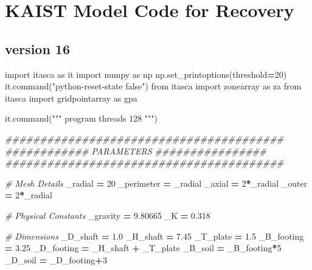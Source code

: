 \documentclass[a4paper, nobind]{templates/ociamthesis}
\newenvironment{Shaded}{\begin{snugshade}}{\end{snugshade}}
\newcommand{\CommentTok}[1]{\textcolor[rgb]{0.56,0.35,0.01}{\textit{#1}}}
\newcommand{\DecValTok}[1]{\textcolor[rgb]{0.00,0.00,0.81}{#1}}
\newcommand{\FloatTok}[1]{\textcolor[rgb]{0.00,0.00,0.81}{#1}}
\newcommand{\ImportTok}[1]{#1}
\newcommand{\NormalTok}[1]{#1}
\newcommand{\OperatorTok}[1]{\textcolor[rgb]{0.81,0.36,0.00}{\textbf{#1}}}
\newcommand{\StringTok}[1]{\textcolor[rgb]{0.31,0.60,0.02}{#1}}
\renewenvironment{Shaded}
{
  \vspace{10pt}%
  \begin{snugshade}%
}{%
  \end{snugshade}%
  \vspace{8pt}%
}
\begin{document}
\newpage

\hypertarget{kaist-model-code-for-recovery}{%
\chapter{KAIST Model Code for Recovery}\label{kaist-model-code-for-recovery}}

\hypertarget{version-16}{%
\section{version 16}\label{version-16}}

\begin{Shaded}
\begin{Highlighting}[]
\ImportTok{import}\NormalTok{ itasca }\ImportTok{as}\NormalTok{ it}
\ImportTok{import}\NormalTok{ numpy }\ImportTok{as}\NormalTok{ np}
\NormalTok{np.set\_printoptions(threshold}\OperatorTok{=}\DecValTok{20}\NormalTok{)}
\NormalTok{it.command(}\StringTok{"python{-}reset{-}state false"}\NormalTok{)}
\ImportTok{from}\NormalTok{ itasca }\ImportTok{import}\NormalTok{ zonearray }\ImportTok{as}\NormalTok{ za}
\ImportTok{from}\NormalTok{ itasca }\ImportTok{import}\NormalTok{ gridpointarray }\ImportTok{as}\NormalTok{ gpa}

\NormalTok{it.command(}\StringTok{"""}
\StringTok{program threads 128}
\StringTok{"""}\NormalTok{)}

\CommentTok{\#\#\#\#\#\#\#\#\#\#\#\#\#\#\#\#\#\#\#\#\#\#\#\#\#\#\#\#\#\#\#\#\#\#\#\#\#\#\#\#}
\CommentTok{\#\#\#\#\#\#\#\#\#\#\#\# PARAMETERS \#\#\#\#\#\#\#\#\#\#\#\#\#\#\#\#}
\CommentTok{\#\#\#\#\#\#\#\#\#\#\#\#\#\#\#\#\#\#\#\#\#\#\#\#\#\#\#\#\#\#\#\#\#\#\#\#\#\#\#\#}

\CommentTok{\# Mesh Details}
\NormalTok{\_radial }\OperatorTok{=} \DecValTok{20}
\NormalTok{\_perimeter }\OperatorTok{=}\NormalTok{ \_radial}
\NormalTok{\_axial }\OperatorTok{=} \DecValTok{2}\OperatorTok{*}\NormalTok{\_radial}
\NormalTok{\_outer }\OperatorTok{=} \DecValTok{2}\OperatorTok{*}\NormalTok{\_radial}

\CommentTok{\# Physical Constants}
\NormalTok{\_gravity }\OperatorTok{=} \FloatTok{9.80665}
\NormalTok{\_K }\OperatorTok{=} \FloatTok{0.318}

\CommentTok{\# Dimensions}
\NormalTok{\_D\_shaft }\OperatorTok{=} \FloatTok{1.0}
\NormalTok{\_H\_shaft }\OperatorTok{=} \FloatTok{7.45}
\NormalTok{\_T\_plate }\OperatorTok{=} \FloatTok{1.5}
\NormalTok{\_B\_footing }\OperatorTok{=} \FloatTok{3.25}
\NormalTok{\_D\_footing }\OperatorTok{=}\NormalTok{ \_H\_shaft }\OperatorTok{+}\NormalTok{ \_T\_plate}
\NormalTok{\_B\_soil }\OperatorTok{=}\NormalTok{ \_B\_footing}\OperatorTok{*}\DecValTok{5}
\NormalTok{\_D\_soil }\OperatorTok{=}\NormalTok{ \_D\_footing}\OperatorTok{+}\DecValTok{3}


\end{Highlighting}
\end{Shaded}
\end{document}
